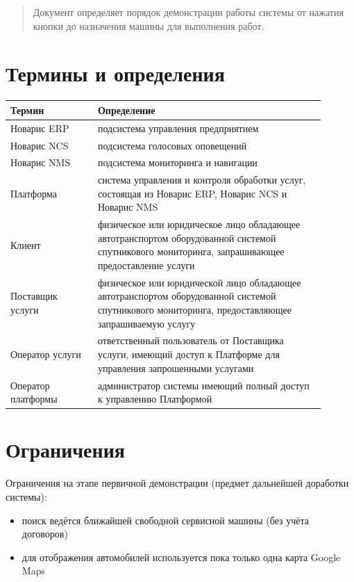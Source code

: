 \documentclass[russian,utf8,12pt,emptystyle]{eskdtext}
\begin{document}
\graphicspath{{images/}}
\begin{abstract}
Документ определяет порядок демонстрации работы системы от нажатия кнопки до назначения машины для выполнения работ.
\end{abstract}
\section*{Термины и определения}
\begin{longtable}[h]{|p{0.25\linewidth}|p{0.65\linewidth}|}
\hline
\textbf{Термин}&\textbf{Определение}\\
\hline
Новарис ERP& подсистема управления предприятием\\
\hline
Новарис NCS& подсистема голосовых оповещений\\
\hline
Новарис NMS& подсистема мониторинга и навигации\\
\hline 
Платформа& система управления и контроля обработки услуг, состоящая из Новарис ERP, Новарис NCS и Новарис NMS\\
\hline
Клиент& физическое или юридическое лицо обладающее автотранспортом оборудованной системой спутникового мониторинга, запрашивающее предоставление услуги\\
\hline
Поставщик услуги& физическое или юридической лицо обладающее автотранспортом оборудованной системой спутникового мониторинга, предоставляющее запрашиваемую услугу\\
\hline
Оператор услуги& ответственный пользователь от Поставщика услуги, имеющий доступ к Платформе для управления запрошенными услугами\\
\hline
Оператор платформы& администратор системы имеющий полный доступ к управлению Платформой\\
\hline
\end{longtable}
\vspace{1cm}
\section*{Ограничения}
Ограничения на этапе первичной демонстрации (предмет дальнейшей доработки системы):
\begin{itemize}
\item поиск ведётся ближайшей свободной сервисной машины (без учёта договоров)
\item для отображения автомобилей используется пока только одна карта Google Maps
\end{itemize} 
\end{document}
